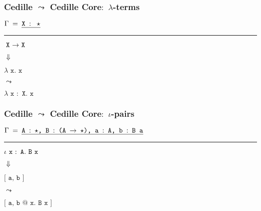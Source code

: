 \documentclass[11pt]{beamer}
\newcommand{\cedtext}[1]{\emph{$\texttt{#1}$}}
\newcommand{\checkagainst}[2]{
\textcolor{black}{\cedtext{#2}}


\textcolor{black}{$\Downarrow$}


\textcolor{colorced}{\cedtext{#1}}
}
\newcommand{\elabrule}[4]{
\begin{frame}[t]
\frametitle{\textcolor{colorced}{Cedille} $\leadsto$ \textcolor{colorcedcore}{Cedille Core}$:$ {#1}}
\vspace{1cm}
\textcolor{darkgray}{\cedtext{$\Gamma$ $=$ \cedtext{#2}}}
\noindent\rule{\textwidth}{0.2pt}

\vfill
\begin{center}
#3

$\leadsto$

\textcolor{colorcedcore}{\cedtext{#4}}

\end{center}
\vfill

\end{frame}
}
\begin{document}
%

\elabrule
  {$\lambda$-terms}
  {X $: \ \star$}
  {\checkagainst{$\lambda$ x$.$ x}{X $\rightarrow$ X}}
  {$\lambda$ x $:$ X. x}

\elabrule
  {$\iota$\hspace{0.02cm}-pairs}
  {A $:$ $\star$, B $:$ (A $\rightarrow$ $\star$), a $:$ A, b $:$ B a}
  {\checkagainst{[ a, b ]}{$\iota$ x $:$ A. B x}}
  {[ a, b @ x$.$ B x ]}
\end{document}
